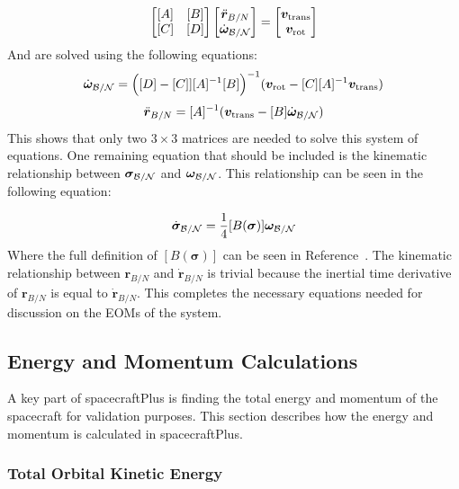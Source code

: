 \begin{equation}
\begin{bmatrix}
[A] & [B]\\
[C] & [D]
\end{bmatrix} \begin{bmatrix}
\ddot{\bm r}_{B/N}\\
\dot{\bm\omega}_{\cal B/N}
\end{bmatrix} = \begin{bmatrix}
\bm v_{\text{trans}}\\
\bm v_{\text{rot}}
\end{bmatrix}
\label{eq:backSub}
\end{equation}
And are solved using the following equations:
\begin{equation}
\dot{\bm\omega}_{\cal B/N} = \Big([D] - [C]][A]^{-1}[B]\Big)^{-1}(\bm v_{\text{rot}} - [C][A]^{-1}\bm v_{\text{trans}})
\end{equation}
\begin{equation}
\ddot{\bm r}_{B/N} = [A]^{-1} (\bm v_{\text{trans}} - [B]\dot{\bm\omega}_{\cal B/N})
\end{equation}
This shows that only two $3\times 3$ matrices are needed to solve this system of equations. One remaining equation that should be included is the kinematic relationship between $\bm \sigma_{\cal{B}/\cal{N}}$ and $\bm \omega_{\cal{B}/\cal{N}}$. This relationship can be seen in the following equation:

\begin{equation}
\dot{\bm \sigma}_{\cal{B}/\cal{N}} = \frac{1}{4} [B(\bm \sigma)]\bm \omega_{\cal{B}/\cal{N}}
\end{equation}
Where the full definition of $[B(\bm \sigma)]$ can be seen in Reference~\cite{schaub}. The kinematic relationship between $\bm r_{B/N}$ and $\dot{\bm r}_{B/N}$ is trivial because the inertial time derivative of $\bm r_{B/N}$ is equal to $\dot{\bm r}_{B/N}$. This completes the necessary equations needed for discussion on the EOMs of the system.

\subsection{Energy and Momentum Calculations}

A key part of spacecraftPlus is finding the total energy and momentum of the spacecraft for validation purposes. This section describes how the energy and momentum is calculated in spacecraftPlus.

\subsubsection{Total Orbital Kinetic Energy}

